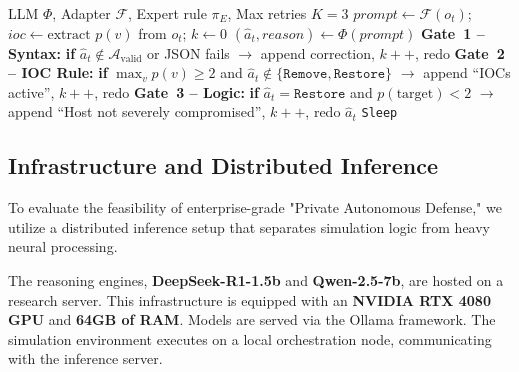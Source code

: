 \documentclass[letterpaper, 10 pt, conference]{ieeeconf}
\begin{document}
\begin{algorithm}[h]
\caption{Chain-of-Self-Correction (CoSC)}
\label{alg:cosc}
\footnotesize
\begin{algorithmic}[1]
\REQUIRE LLM $\Phi$, Adapter $\mathcal{F}$, Expert rule $\pi_E$, Max retries $K{=}3$
\STATE $\mathit{prompt} \gets \mathcal{F}(o_t)$; \;
       $\mathit{ioc} \gets \text{extract } p(v)$ from $o_t$; \;
       $k \gets 0$
    \STATE $(\hat{a}_t, \mathit{reason}) \gets \Phi(\mathit{prompt})$
    \STATE \textbf{Gate~1 -- Syntax:}
           \textbf{if} $\hat{a}_t \notin \mathcal{A}_{\mathrm{valid}}$
           or JSON fails $\to$ append correction, $k{+}{+}$, redo
    \STATE \textbf{Gate~2 -- IOC Rule:}
           \textbf{if} $\max_v p(v){\geq}2$ and
           $\hat{a}_t \notin \{\texttt{Remove},\texttt{Restore}\}$
           $\to$ append ``IOCs active'', $k{+}{+}$, redo
    \STATE \textbf{Gate~3 -- Logic:}
           \textbf{if} $\hat{a}_t{=}\texttt{Restore}$ and
           $p(\mathrm{target}){<}2$
           $\to$ append ``Host not severely compromised'', $k{+}{+}$, redo
    \RETURN $\hat{a}_t$ 
\ENDWHILE
\RETURN \texttt{Sleep} 
\end{algorithmic}
\end{algorithm}

\subsection{Infrastructure and Distributed Inference}
To evaluate the feasibility of enterprise-grade "Private Autonomous Defense," we utilize a distributed inference setup that separates simulation logic from heavy neural processing. 

The reasoning engines, \textbf{DeepSeek-R1-1.5b} and \textbf{Qwen-2.5-7b}, are hosted on a  research server. This infrastructure is equipped with an \textbf{NVIDIA RTX 4080 GPU} and \textbf{64GB of RAM}. Models are served via the Ollama framework. The simulation environment executes on a local orchestration node, communicating with the inference server.
\end{document}
